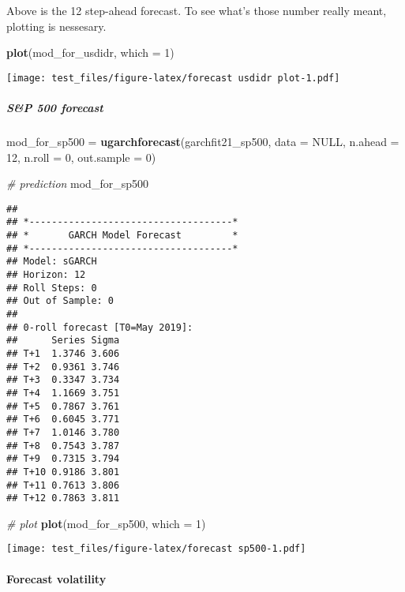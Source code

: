 \documentclass[]{article}
\newenvironment{Shaded}{\begin{snugshade}}{\end{snugshade}}
\newcommand{\KeywordTok}[1]{\textcolor[rgb]{0.13,0.29,0.53}{\textbf{#1}}}
\newcommand{\DataTypeTok}[1]{\textcolor[rgb]{0.13,0.29,0.53}{#1}}
\newcommand{\DecValTok}[1]{\textcolor[rgb]{0.00,0.00,0.81}{#1}}
\newcommand{\StringTok}[1]{\textcolor[rgb]{0.31,0.60,0.02}{#1}}
\newcommand{\CommentTok}[1]{\textcolor[rgb]{0.56,0.35,0.01}{\textit{#1}}}
\newcommand{\OtherTok}[1]{\textcolor[rgb]{0.56,0.35,0.01}{#1}}
\newcommand{\NormalTok}[1]{#1}
\let\oldparagraph\paragraph
\renewcommand{\paragraph}[1]{\oldparagraph{#1}\mbox{}}
\let\oldsubparagraph\subparagraph
\renewcommand{\subparagraph}[1]{\oldsubparagraph{#1}\mbox{}}
\begin{document}
Above is the 12 step-ahead forecast. To see what's those number really
meant, plotting is nessesary.

\begin{Shaded}
\begin{Highlighting}[]
\KeywordTok{plot}\NormalTok{(mod_for_usdidr, }\DataTypeTok{which =} \DecValTok{1}\NormalTok{)}
\end{Highlighting}
\end{Shaded}

\texttt{[image: test\_files/figure-latex/forecast usdidr plot-1.pdf]}

\subparagraph{S\&P 500 forecast}\label{sp-500-forecast}

\begin{Shaded}
\begin{Highlighting}[]
\NormalTok{mod_for_sp500 =}\StringTok{ }\KeywordTok{ugarchforecast}\NormalTok{(garchfit21_sp500, }\DataTypeTok{data =} \OtherTok{NULL}\NormalTok{, }\DataTypeTok{n.ahead =} \DecValTok{12}\NormalTok{, }\DataTypeTok{n.roll =} \DecValTok{0}\NormalTok{, }\DataTypeTok{out.sample =} \DecValTok{0}\NormalTok{)}

\CommentTok{# prediction}
\NormalTok{mod_for_sp500}
\end{Highlighting}
\end{Shaded}

\begin{verbatim}
## 
## *------------------------------------*
## *       GARCH Model Forecast         *
## *------------------------------------*
## Model: sGARCH
## Horizon: 12
## Roll Steps: 0
## Out of Sample: 0
## 
## 0-roll forecast [T0=May 2019]:
##      Series Sigma
## T+1  1.3746 3.606
## T+2  0.9361 3.746
## T+3  0.3347 3.734
## T+4  1.1669 3.751
## T+5  0.7867 3.761
## T+6  0.6045 3.771
## T+7  1.0146 3.780
## T+8  0.7543 3.787
## T+9  0.7315 3.794
## T+10 0.9186 3.801
## T+11 0.7613 3.806
## T+12 0.7863 3.811
\end{verbatim}

\begin{Shaded}
\begin{Highlighting}[]
\CommentTok{# plot}
\KeywordTok{plot}\NormalTok{(mod_for_sp500, }\DataTypeTok{which =} \DecValTok{1}\NormalTok{)}
\end{Highlighting}
\end{Shaded}

\texttt{[image: test\_files/figure-latex/forecast sp500-1.pdf]}

\paragraph{Forecast volatility}\label{forecast-volatility}
\end{document}
